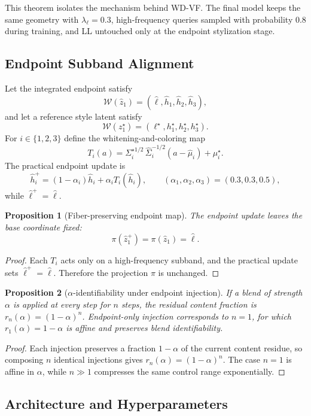 \documentclass[10pt,letterpaper]{article}
\newtheorem*{sproposition}{Proposition}
\begin{document}
This theorem isolates the mechanism behind WD-VF. The final model keeps the same geometry with $\lambda_\ell=0.3$, high-frequency queries sampled with probability $0.8$ during training, and LL untouched only at the endpoint stylization stage.

\subsection{Endpoint Subband Alignment}
\label{sec:endpoint}

Let the integrated endpoint satisfy
\[
\mathcal W(\hat z_1) = (\hat \ell,\hat h_1,\hat h_2,\hat h_3),
\]
and let a reference style latent satisfy
\[
\mathcal W(z_1^\star) = (\ell^\star,h_1^\star,h_2^\star,h_3^\star).
\]
For $i\in\{1,2,3\}$ define the whitening-and-coloring map
\[
T_i(a) = \Sigma_i^{\star 1/2}\,\hat\Sigma_i^{-1/2}(a-\hat\mu_i)+\mu_i^\star.
\]
The practical endpoint update is
\[
\hat h_i^+ = (1-\alpha_i)\hat h_i + \alpha_i T_i(\hat h_i),
\qquad
(\alpha_1,\alpha_2,\alpha_3)=(0.3,0.3,0.5),
\]
while $\hat \ell^+ = \hat \ell$.

\begin{sproposition}[Fiber-preserving endpoint map]
The endpoint update leaves the base coordinate fixed:
\[
\pi(\hat z_1^+) = \pi(\hat z_1) = \hat \ell.
\]
\end{sproposition}
\begin{proof}
Each $T_i$ acts only on a high-frequency subband, and the practical update sets $\hat \ell^+ = \hat \ell$. Therefore the projection $\pi$ is unchanged.
\end{proof}

\begin{sproposition}[$\alpha$-identifiability under endpoint injection]
If a blend of strength $\alpha$ is applied at every step for $n$ steps, the residual content fraction is $r_n(\alpha)=(1-\alpha)^n$. Endpoint-only injection corresponds to $n=1$, for which $r_1(\alpha)=1-\alpha$ is affine and preserves blend identifiability.
\end{sproposition}
\begin{proof}
Each injection preserves a fraction $1-\alpha$ of the current content residue, so composing $n$ identical injections gives $r_n(\alpha)=(1-\alpha)^n$. The case $n=1$ is affine in $\alpha$, while $n\gg1$ compresses the same control range exponentially.
\end{proof}

\subsection{Architecture and Hyperparameters}
\label{sec:hyper}
\end{document}
